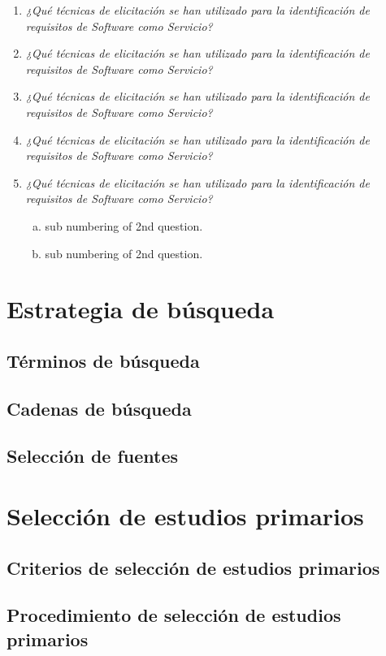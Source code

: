 \documentclass{article}
\begin{document}
\begin{enumerate}[P 1.-]
  \item\emph{¿Qué técnicas de elicitación se han utilizado para la identificación de requisitos de Software como Servicio? }
  \item\emph{¿Qué técnicas de elicitación se han utilizado para la identificación de requisitos de Software como Servicio? }
  \item\emph{¿Qué técnicas de elicitación se han utilizado para la identificación de requisitos de Software como Servicio? }
  \item\emph{¿Qué técnicas de elicitación se han utilizado para la identificación de requisitos de Software como Servicio? }
  \item\emph{¿Qué técnicas de elicitación se han utilizado para la identificación de requisitos de Software como Servicio? }
  \begin{enumerate}[(a)]
  \item sub numbering of 2nd question.
  \item sub numbering of 2nd question.
  \end{enumerate}
\end{enumerate}

\newpage


\section{Estrategia de búsqueda}
\subsection{Términos de búsqueda}
\subsection{Cadenas de búsqueda}
\subsection{Selección de fuentes}
\section{Selección de estudios primarios}
\subsection{Criterios de selección de estudios primarios}
\subsection{Procedimiento de selección de estudios primarios}
\end{document}

